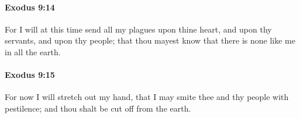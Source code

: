 		\paragraph{Exodus 9:14} %
			\label{EXODUS-9-14}

			For I will at this time send all my plagues upon thine heart, and upon thy servants, and upon thy people; that thou mayest know that there is none like me in all the earth.


		\paragraph{Exodus 9:15} %
			\label{EXODUS-9-15}

			For now I will stretch out my hand, that I may smite thee and thy people with pestilence; and thou shalt be cut off from the earth.


